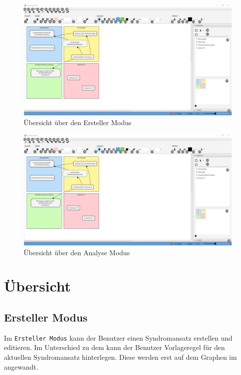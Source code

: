 \documentclass[enabledeprecatedfontcommands,fontsize=11pt,paper=a4,twoside]{scrartcl}
\begin{document}
\begin{landscape}
	\begin{figure}
		\centering
		\includegraphics[width=22cm]{overview.png}
		\caption{Übersicht über den Ersteller Modus}
	\end{figure}
\end{landscape}
\begin{landscape}
	\begin{figure}
		\centering
		\includegraphics[width=22cm]{overview.png}
		\caption{Übersicht über den Analyse Modus}
	\end{figure}
\end{landscape}




\newpage	
\section{Übersicht} \label{sec:uebersicht}
\subsection{Ersteller Modus}
Im \texttt{Ersteller Modus} kann der Benutzer einen Syndromansatz erstellen und editieren. Im Unterschied zu dem  kann der Benutzer Vorlageregel für den aktuellen Syndromansatz hinterlegen. Diese werden erst auf dem Graphen im  angewandt. 
\end{document}
